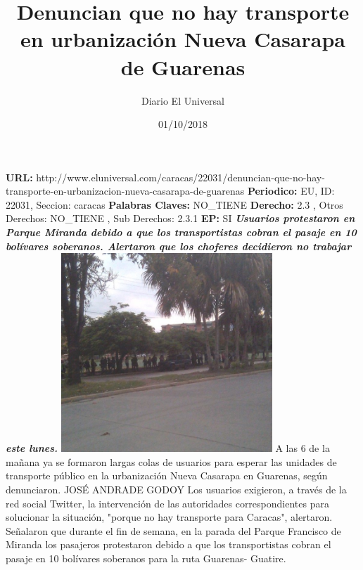 \documentclass{article}%
\title{\textbf{Denuncian que no hay transporte en urbanización Nueva Casarapa de Guarenas}}%
\author{Diario El Universal}%
\date{01/10/2018}%
\begin{document}
%
\normalsize%
\maketitle%
\textbf{URL: }%
http://www.eluniversal.com/caracas/22031/denuncian{-}que{-}no{-}hay{-}transporte{-}en{-}urbanizacion{-}nueva{-}casarapa{-}de{-}guarenas\newline%
%
\textbf{Periodico: }%
EU, %
ID: %
22031, %
Seccion: %
caracas\newline%
%
\textbf{Palabras Claves: }%
NO\_TIENE\newline%
%
\textbf{Derecho: }%
2.3%
, Otros Derechos: %
NO\_TIENE%
, Sub Derechos: %
2.3.1%
\newline%
%
\textbf{EP: }%
SI\newline%
\newline%
%
\textbf{\textit{Usuarios protestaron en Parque Miranda debido a que los transportistas cobran el pasaje en 10 bolívares soberanos. Alertaron que los choferes decidieron no trabajar este lunes.}}%
\newline%
\newline%
%
\includegraphics[width=300px]{62.jpg}%
\newline%
%
A las 6 de la mañana ya se formaron largas colas de usuarios para esperar las unidades de transporte público en la urbanización Nueva Casarapa en Guarenas, según denunciaron.%
\newline%
%
JOSÉ ANDRADE GODOY%
\newline%
%
Los usuarios exigieron, a través de la red social Twitter, la intervención de las autoridades correspondientes para solucionar la situación, "porque no hay transporte para Caracas", alertaron.%
\newline%
%
Señalaron que durante el fin de semana, en la parada del Parque Francisco de Miranda los pasajeros protestaron debido a que los transportistas cobran el pasaje en 10 bolívares soberanos para la ruta Guarenas{-} Guatire.%
\newline%
%
\end{document}
